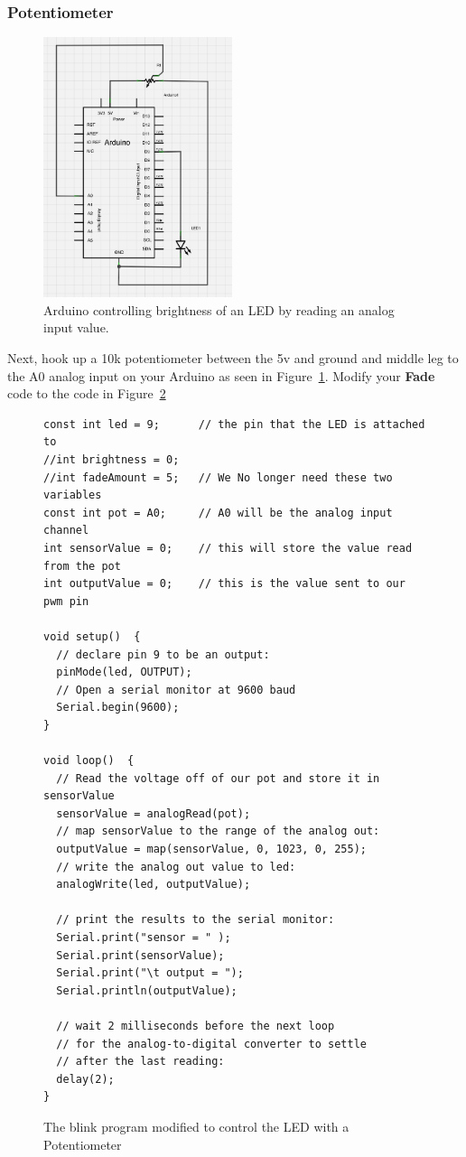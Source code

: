 \documentclass[11pt,a4paper]{article}
\begin{document}
\subsubsection{Potentiometer} %
\label{sub:potentiometer}

\begin{figure}[htbp]
    \centering
        \includegraphics[height=3in]{figures/pot-fade.png}
    \caption{Arduino controlling brightness of an LED by reading an analog input value.}
    \label{fig:figures_pot-fade}
\end{figure}


Next, hook up a 10k potentiometer between the 5v and ground and middle leg to the A0 analog input on your Arduino as seen in Figure~\ref{fig:figures_pot-fade}.  Modify your \textbf{Fade} code to the code in Figure~\ref{fig:fade_mod}


\begin{figure}[htbp]
	\centering
\begin{verbatim}
const int led = 9;      // the pin that the LED is attached to
//int brightness = 0;
//int fadeAmount = 5;   // We No longer need these two variables
const int pot = A0;     // A0 will be the analog input channel
int sensorValue = 0;    // this will store the value read from the pot
int outputValue = 0;    // this is the value sent to our pwm pin

void setup()  { 
  // declare pin 9 to be an output:
  pinMode(led, OUTPUT);
  // Open a serial monitor at 9600 baud
  Serial.begin(9600); 
} 

void loop()  { 
  // Read the voltage off of our pot and store it in sensorValue
  sensorValue = analogRead(pot);   
  // map sensorValue to the range of the analog out:
  outputValue = map(sensorValue, 0, 1023, 0, 255); 
  // write the analog out value to led:
  analogWrite(led, outputValue);
  
  // print the results to the serial monitor:
  Serial.print("sensor = " );                       
  Serial.print(sensorValue);      
  Serial.print("\t output = ");      
  Serial.println(outputValue); 

  // wait 2 milliseconds before the next loop
  // for the analog-to-digital converter to settle
  // after the last reading:
  delay(2);  
}
\end{verbatim}
	\caption{The blink program modified to control the LED with a Potentiometer}
	\label{fig:fade_mod}
\end{figure}
\end{document}
